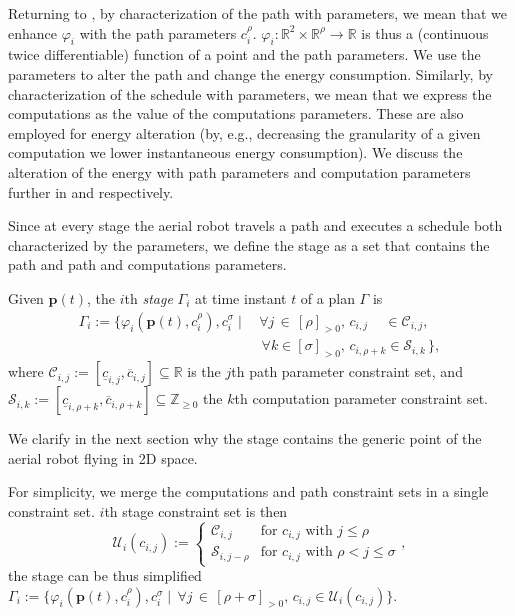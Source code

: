 Returning to , by characterization of the path with parameters, we mean that we enhance $\varphi_i$ with the path parameters $c_i^\rho$. $\varphi_i:\mathbb{R}^2\times\mathbb{R}^\rho\rightarrow\mathbb{R}$ is thus a (continuous twice differentiable) function of a point and the path parameters. We use the parameters to alter the path and change the energy consumption. Similarly, by characterization of the schedule with parameters, we mean that we express the computations as the value of the computations parameters. These are also employed for energy alteration (by, e.g., decreasing the granularity of a given computation we lower instantaneous energy consumption). We discuss the alteration of the energy with path parameters and computation parameters further in  and  respectively.

Since at every stage the aerial robot travels a path and executes a schedule both characterized by the parameters, we define the stage as a set that contains the path and path and computations parameters.

\begin{highlight}  
  \begin{defn}[Stage]\label{def:stage}
    Given $\mathbf{p}(t)$, the $i$th \emph{stage} $\Gamma_i$ at time instant $t$ of a plan $\Gamma$ is
    \begin{equation*}\begin{split}
      \Gamma_i:=\{\varphi_i(\mathbf{p}(t),c_i^\rho),c_i^\sigma\mid
      \,&\forall j\,\in\,[\rho]_{>0},\,c_{i,j}\,\,\,\,\,\,\,\in\mathcal{C}_{i,j},\,\\
        &\,\forall k\in[\sigma]_{>0},\,c_{i,\rho+k}\in\mathcal{S}_{i,k}\,\},
    \end{split}\end{equation*}
    where $\mathcal{C}_{i,j}:=[\underline{c}_{i,j},\overline{c}_{i,j}]\subseteq\mathbb{R}$ is the $j$th path parameter constraint set, and $\mathcal{S}_{i,k}:=[\underline{c}_{i,\rho+k},\overline{c}_{i,\rho+k}]\subseteq\mathbb{Z}_{\geq 0}$ the $k$th computation parameter constraint set.
  \end{defn}
\end{highlight}

We clarify in the next section why the stage contains the generic point of the aerial robot flying in 2D space.

For simplicity, we merge the computations and path constraint sets in a single constraint set. $i$th stage constraint set is then
\begin{equation}\label{eq:constraint-set}
  \mathcal{U}_i(c_{i,j}):=\begin{cases}
  \mathcal{C}_{i,j} & \text{for } c_{i,j} \text{ with } j\leq\rho\\
  \mathcal{S}_{i,j-\rho} & \text{for } c_{i,j} \text{ with } \rho<j\leq\sigma
\end{cases},\end{equation}
the stage can be thus simplified $\Gamma_i:=\{\varphi_i(\mathbf{p}(t),c_i^\rho),c_i^\sigma\mid \,\forall j\,\in\,[\rho+\sigma]_{>0},\,c_{i,j}\in\mathcal{U}_i(c_{i,j})\}$.


